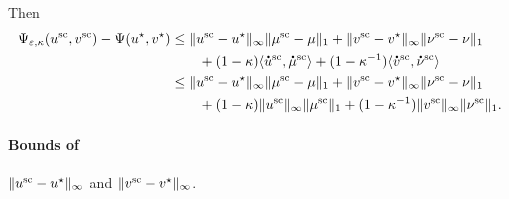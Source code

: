 Then
\begin{align}
\Psi_{\varepsilon, \kappa}(u^{\text{sc}} ,v^{\text{sc}}) -\Psi(u^\star, v^\star) &
\leq \norm{{u}^{\text{sc}} - {u}^\star}_\infty \norm{\mu^{\text{sc}} - \mu}_1 + \norm{{v}^{\text{sc}} - {v}^\star}_\infty \norm{\nu^{\text{sc}} - \nu}_1\nonumber\\
&\qquad + (1- \kappa)\inr{\dt{u}^{\text{sc}} ,\dt{\mu}^{\text{sc}}} + (1- \kappa^{-1})\inr{\dt{v}^{\text{sc}} ,\dt{\nu}^{\text{sc}}}\nonumber\\
&\leq \norm{{u}^{\text{sc}} - {u}^\star}_\infty \norm{\mu^{\text{sc}} - \mu}_1 + \norm{{v}^{\text{sc}} - {v}^\star}_\infty\norm{\nu^{\text{sc}} - \nu}_1 \nonumber\\
&\qquad + (1- \kappa)\norm{{u}^{\text{sc}}}_\infty\norm{{\mu}^{\text{sc}}}_1 + (1- \kappa^{-1})\norm{{v}^{\text{sc}}}_\infty\norm{{\nu}^{\text{sc}}}_1.\label{priori_bounds_induction}
\end{align}

\paragraph{Bounds of}$\|{u}^{\textrm{sc}} - {u}^\star\|_\infty $ and $\|{v}^{\text{sc}} - {v}^\star\|_\infty $.

